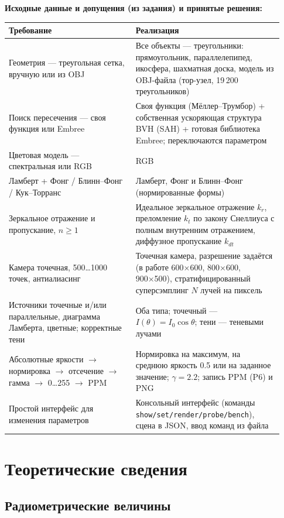 \documentclass[12pt,a4paper]{article}
\begin{document}
\textbf{Исходные данные и допущения (из задания) и принятые решения:}

\begin{center}
\small
\begin{tabular}{>{\raggedright\arraybackslash}p{0.43\linewidth}>{\raggedright\arraybackslash}p{0.5\linewidth}}
\toprule
Требование & Реализация \\
\midrule
Геометрия — треугольная сетка, вручную или из OBJ & Все объекты — треугольники: прямоугольник, параллелепипед, икосфера, шахматная доска, модель из OBJ-файла (тор-узел, 19\,200 треугольников) \\
Поиск пересечения — своя функция или Embree & Своя функция (Мёллер–Трумбор) + собственная ускоряющая структура BVH (SAH) + готовая библиотека Embree; переключаются параметром \\
Цветовая модель — спектральная или RGB & RGB \\
Ламберт + Фонг / Блинн–Фонг / Кук–Торранс & Ламберт, Фонг и Блинн–Фонг (нормированные формы) \\
Зеркальное отражение и пропускание, $n \ge 1$ & Идеальное зеркальное отражение $k_r$, преломление $k_t$ по закону Снеллиуса с полным внутренним отражением, диффузное пропускание $k_{dt}$ \\
Камера точечная, 500…1000 точек, антиалиасинг & Точечная камера, разрешение задаётся (в работе 600×600, 800×600, 900×500), стратифицированный суперсэмплинг $N$ лучей на пиксель \\
Источники точечные и/или параллельные, диаграмма Ламберта, цветные; корректные тени & Оба типа; точечный — $I(\theta)=I_0\cos\theta$; тени — теневыми лучами \\
Абсолютные яркости $\to$ нормировка $\to$ отсечение $\to$ гамма $\to$ 0…255 $\to$ PPM & Нормировка на максимум, на среднюю яркость 0.5 или на заданное значение; $\gamma = 2.2$; запись PPM (P6) и PNG \\
Простой интерфейс для изменения параметров & Консольный интерфейс (команды \texttt{show/set/render/probe/bench}), сцена в JSON, ввод команд из файла \\
\bottomrule
\end{tabular}
\end{center}

\section{Теоретические сведения}

\subsection{Радиометрические величины}
\end{document}
